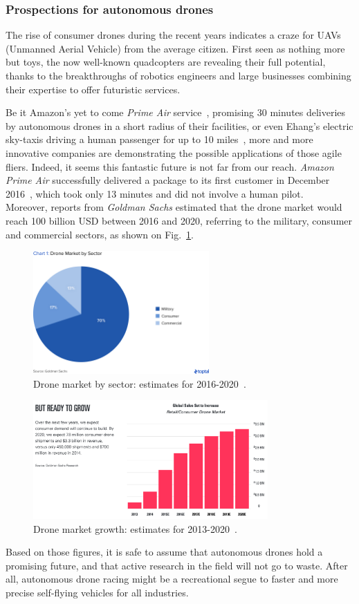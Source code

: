 \subsubsection{Prospections for autonomous drones}
The rise of consumer drones during the recent years indicates a craze for UAVs
(Unmanned Aerial Vehicle) from the average citizen. First seen as nothing more
but toys, the now well-known quadcopters are revealing their full potential,
thanks to the breakthroughs of robotics engineers and large businesses combining
their expertise to offer futuristic services.

Be it Amazon's yet to come \emph{Prime Air} service~\cite{PrimeAir}, promising
30 minutes deliveries by autonomous drones in a short radius of their
facilities, or even Ehang's electric sky-taxis driving a human passenger for up
to 10 miles~\cite{Ehang184}, more and more innovative companies are
demonstrating the possible applications of those agile fliers.  Indeed, it seems
this fantastic future is not far from our reach. \emph{Amazon Prime Air}
successfully delivered a package to its first customer in December
2016~\cite{PrimeAirFirst}, which took only 13 minutes and did not involve a
human pilot.\\

Moreover, reports from \emph{Goldman Sachs} \cite{TopTal} estimated that the
drone market would reach 100 billion USD between 2016 and 2020, referring to
the military, consumer and commercial sectors, as shown on
Fig.~\ref{fig:toptal}.\\

\begin{figure}[h]
	\centering
	\includegraphics[width=0.6\textwidth]{figure/toptal.png}
	\caption{Drone market by sector: estimates for 2016-2020~\cite{TopTal}.}
	\label{fig:toptal}
\end{figure}

\begin{figure}[h]
	\centering
	\includegraphics[width=0.8\textwidth]{figure/drone_market.png}
	\caption{Drone market growth: estimates for 2013-2020~\cite{Goldman}.}
	\label{fig:goldmansachs}
\end{figure}

Based on those figures, it is safe to assume that autonomous drones hold a
promising future, and that active research in the field will not go to waste.
After all, autonomous drone racing might be a recreational segue to faster and
more precise self-flying vehicles for all industries.

